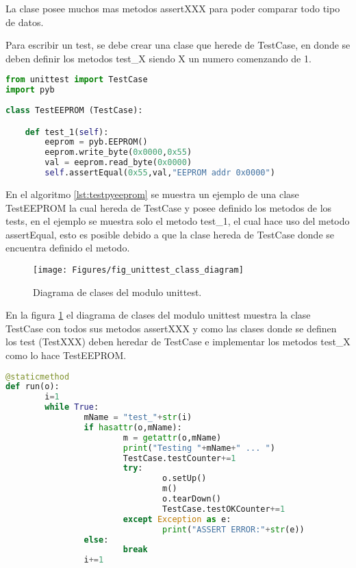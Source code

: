 La clase posee muchos mas metodos assertXXX para poder comparar todo tipo de datos.

Para escribir un test, se debe crear una clase que herede de TestCase, en donde se deben definir los metodos test\_X siendo X un numero comenzando de 1.

\begin{lstlisting}[label={lst:testpyeeprom},caption=Clase que hereda de TestCase donde se definen los metodos de test para la EEPROM., language={python}]
from unittest import TestCase
import pyb
  
class TestEEPROM (TestCase):

    def test_1(self):
        eeprom = pyb.EEPROM()
        eeprom.write_byte(0x0000,0x55)
        val = eeprom.read_byte(0x0000)
        self.assertEqual(0x55,val,"EEPROM addr 0x0000")       
\end{lstlisting}

En el algoritmo \ref{lst:testpyeeprom} se muestra un ejemplo de una clase TestEEPROM la cual hereda de TestCase y posee definido los metodos de los tests, en el ejemplo se muestra solo el metodo test\_1, el cual hace uso del metodo assertEqual, esto es posible debido a que la clase hereda de TestCase donde se encuentra definido el metodo.

\begin{figure}[ht]
  \centering
    \texttt{[image: Figures/fig\_unittest\_class\_diagram]}
  \caption{Diagrama de clases del modulo unittest.}
  \label{fig:unittestpythonclassd}
\end{figure}

En la figura \ref{fig:unittestpythonclassd} el diagrama de clases del modulo unittest muestra la clase TestCase con todos sus metodos assertXXX y como las clases donde se definen los test (TestXXX) deben heredar de TestCase e implementar los metodos test\_X como lo hace TestEEPROM.

\begin{lstlisting}[label={lst:utestsrun},caption=Metodo que ejecuta los metodos de test en la biblioteca unittest.py implementada., language={python}]
@staticmethod
def run(o):
		i=1
		while True:
				mName = "test_"+str(i)
				if hasattr(o,mName):
						m = getattr(o,mName)
						print("Testing "+mName+" ... ")
						TestCase.testCounter+=1
						try:
								o.setUp()
								m()
								o.tearDown()
								TestCase.testOKCounter+=1
						except Exception as e:
								print("ASSERT ERROR:"+str(e))
				else:
						break
				i+=1
\end{lstlisting}

